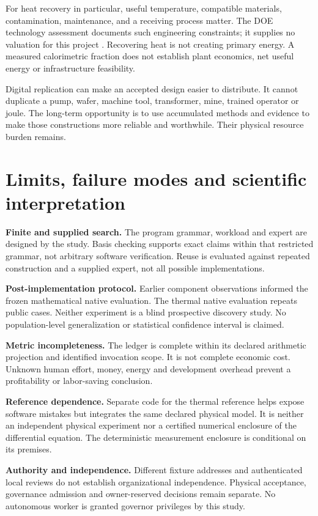 \documentclass[11pt,a4paper]{article}
\begin{document}
For heat recovery in particular, useful temperature, compatible materials, contamination, maintenance, and a receiving process matter. The DOE technology assessment documents such engineering constraints; it supplies no valuation for this project \cite{doe2015wasteheat}. Recovering heat is not creating primary energy. A measured calorimetric fraction does not establish plant economics, net useful energy or infrastructure feasibility.

Digital replication can make an accepted design easier to distribute. It cannot duplicate a pump, wafer, machine tool, transformer, mine, trained operator or joule. The long-term opportunity is to use accumulated methods and evidence to make those constructions more reliable and worthwhile. Their physical resource burden remains.
\FloatBarrier

\section{Limits, failure modes and scientific interpretation}\label{sec:limits}
\textbf{Finite and supplied search.} The program grammar, workload and expert are designed by the study. Basis checking supports exact claims within that restricted grammar, not arbitrary software verification. Reuse is evaluated against repeated construction and a supplied expert, not all possible implementations.

\textbf{Post-implementation protocol.} Earlier component observations informed the frozen mathematical native evaluation. The thermal native evaluation repeats public cases. Neither experiment is a blind prospective discovery study. No population-level generalization or statistical confidence interval is claimed.

\textbf{Metric incompleteness.} The ledger is complete within its declared arithmetic projection and identified invocation scope. It is not complete economic cost. Unknown human effort, money, energy and development overhead prevent a profitability or labor-saving conclusion.

\textbf{Reference dependence.} Separate code for the thermal reference helps expose software mistakes but integrates the same declared physical model. It is neither an independent physical experiment nor a certified numerical enclosure of the differential equation. The deterministic measurement enclosure is conditional on its premises.

\textbf{Authority and independence.} Different fixture addresses and authenticated local reviews do not establish organizational independence. Physical acceptance, governance admission and owner-reserved decisions remain separate. No autonomous worker is granted governor privileges by this study.
\end{document}
